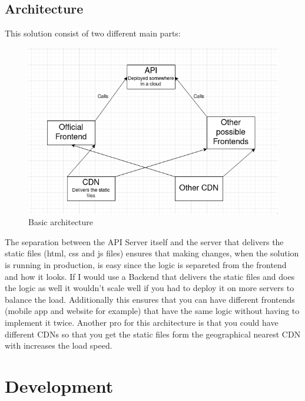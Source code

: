 \documentclass{article}
\begin{document}
\subsection{Architecture}
This solution consist of two different main parts:
\begin{figure}
    \includegraphics[width=\linewidth]{architecture.jpeg}
    \caption{Basic architecture}
\end{figure}
The separation between the API Server itself and the server that delivers the static files (html, css and js files) ensures that making changes, when the solution is running in production, is easy since the logic is separeted from the frontend and how it looks. If I would use a Backend that delivers the static files and does the logic as well it wouldn't scale well if you had to deploy it on more servers to balance the load. Additionally this ensures that you can have different frontends (mobile app and website for example) that have the same logic without having to implement it twice. Another pro for this architecture is that you could have different CDNs so that you get the static files form the geographical nearest CDN with increases the load speed.


\section{Development}
\end{document}
